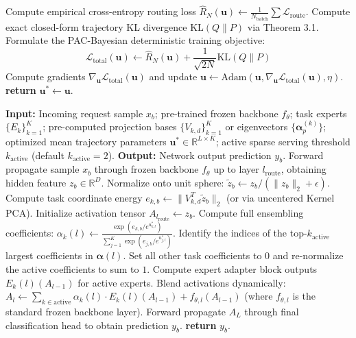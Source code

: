 \begin{algorithm}[tb]
\begin{algorithmic}[1]
    \STATE Compute empirical cross-entropy routing loss $\hat{R}_N(\mathbf{u}) \leftarrow \frac{1}{N_{\text{batch}}} \sum \mathcal{L}_{\text{route}}$.
    \STATE Compute exact closed-form trajectory KL divergence $\text{KL}(Q \| P)$ via Theorem 3.1.
    \STATE Formulate the PAC-Bayesian deterministic training objective:
    $$\mathcal{L}_{\text{total}}(\mathbf{u}) \leftarrow \hat{R}_N(\mathbf{u}) + \frac{1}{\sqrt{2N}} \text{KL}(Q \| P)$$
    \STATE Compute gradients $\nabla_{\mathbf{u}} \mathcal{L}_{\text{total}}(\mathbf{u})$ and update $\mathbf{u} \leftarrow \text{Adam}(\mathbf{u}, \nabla_{\mathbf{u}} \mathcal{L}_{\text{total}}(\mathbf{u}), \eta)$.
\ENDFOR
\STATE \textbf{return} $\mathbf{u}^* \leftarrow \mathbf{u}$.
\end{algorithmic}
\end{algorithm}

\begin{algorithm}[tb]
\caption{PAC-STM Online Serving-Time Inference Phase}
\label{alg:serving}
\begin{algorithmic}[1]
\STATE \textbf{Input:} Incoming request sample $x_b$; pre-trained frozen backbone $f_\theta$; task experts $\{E_k\}_{k=1}^K$; pre-computed projection bases $\{V_{k, d}\}_{k=1}^K$ or eigenvectors $\{\boldsymbol{\alpha}^{(k)}_p\}$; optimized mean trajectory parameters $\mathbf{u}^* \in \mathbb{R}^{L \times K}$; active sparse serving threshold $k_{\text{active}}$ (default $k_{\text{active}}=2$).
\STATE \textbf{Output:} Network output prediction $y_b$.
\STATE {}
\STATE Forward propagate sample $x_b$ through frozen backbone $f_\theta$ up to layer $l_{\text{route}}$, obtaining hidden feature $z_b \in \mathbb{R}^D$.
\STATE Normalize onto unit sphere: $\tilde{z}_b \leftarrow z_b / (\|z_b\|_2 + \epsilon)$.
    \STATE Compute task coordinate energy $e_{k, b} \leftarrow \|V_{k, d}^T \tilde{z}_b\|_2$ (or via uncentered Kernel PCA).
\ENDFOR
\STATE {}
\STATE Initialize activation tensor $A_{l_{\text{route}}} \leftarrow z_b$.
    \STATE Compute full ensembling coefficients: $\alpha_{k}(l) \leftarrow \frac{\exp(e_{k, b} / e^{u^*_{k, l}})}{\sum_{j=1}^K \exp(e_{j, b} / e^{u^*_{j, l}})}$.
        \STATE Identify the indices of the top-$k_{\text{active}}$ largest coefficients in $\boldsymbol{\alpha}(l)$.
        \STATE Set all other task coefficients to $0$ and re-normalize the active coefficients to sum to $1$.
    \ENDIF
    \STATE Compute expert adapter block outputs $E_k(l)(A_{l-1})$ for active experts.
    \STATE Blend activations dynamically: $A_l \leftarrow \sum_{k \in \text{active}} \alpha_k(l) \cdot E_k(l)(A_{l-1}) + f_{\theta, l}(A_{l-1})$ (where $f_{\theta, l}$ is the standard frozen backbone layer).
\ENDFOR
\STATE Forward propagate $A_L$ through final classification head to obtain prediction $y_b$.
\STATE \textbf{return} $y_b$.
\end{algorithmic}
\end{algorithm}

